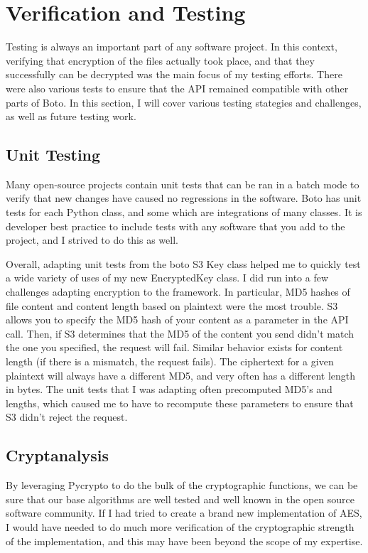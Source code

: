 \section{Verification and Testing}

Testing is always an important part of any software project. In this context, verifying that encryption of the files actually took place,
and that they successfully can be decrypted was the main focus of my testing efforts. There were also various tests to ensure that
the API remained compatible with other parts of Boto. In this section, I will cover various testing stategies and challenges, as well as future testing work.

\subsection{Unit Testing}
Many open-source projects contain unit tests that can be ran in a batch mode to verify that new changes have caused no regressions
in the software. Boto has unit tests for each Python class, and some which are integrations of many classes. It is developer best practice to include tests with any software that you add to the project, and I strived to do this as well.

Overall, adapting unit tests from the boto S3 Key class helped me to quickly test a wide variety of uses of my new EncryptedKey class.
I did run into a few challenges adapting encryption to the framework. In particular, MD5 hashes of file content and 
content length based on plaintext were the most trouble. S3 allows you to specify the MD5 hash of your content as a parameter
in the API call. Then, if S3 determines that the MD5 of the content you send didn't match the one you specified, the request will fail.
Similar behavior exists for content length (if there is a mismatch, the request fails). The ciphertext for a given plaintext will always have a different MD5, and very often has a different length in bytes. The unit tests that I was adapting often precomputed MD5's 
and lengths, which caused me to have to recompute these parameters to ensure that S3 didn't reject the request.  

\subsection{Cryptanalysis}

By leveraging Pycrypto to do the bulk of the cryptographic functions, we can be sure that our base algorithms are 
well tested and well known in the open source software community. If I had tried to create a brand new implementation of AES,
I would have needed to do much more verification of the cryptographic strength of the implementation, and this may have been beyond
the scope of my expertise.

